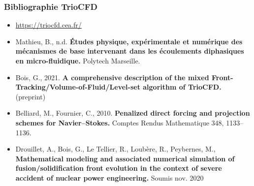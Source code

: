 \documentclass{beamer}
\begin{document}
\begin{frame}
    \frametitle{Bibliographie TrioCFD}
	\footnotesize
\begin{itemize}
	\item \url{https://triocfd.cea.fr/}
	\item Mathieu, B., n.d. \textbf{Études physique, expérimentale et numérique des mécanismes de base intervenant dans les écoulements diphasiques en micro-fluidique.} Polytech Marseille.
	\item Bois, G., 2021. \textbf{A comprehensive description of the mixed Front-Tracking/Volume-of-Fluid/Level-set algorithm of TrioCFD.} (preprint)
	\item Belliard, M., Fournier, C., 2010. \textbf{Penalized direct forcing and projection schemes for Navier–Stokes.} Comptes Rendus Mathematique 348, 1133–1136.
	\item \color{blue} Drouillet, A., Bois, G., Le Tellier, R., Loubère, R., Peybernes, M.,  \textbf{Mathematical modeling and associated numerical simulation of fusion/solidification front evolution in the context of severe accident of nuclear power engineering.} Soumis nov. 2020
 

\end{itemize}


\end{frame}
\end{document}
